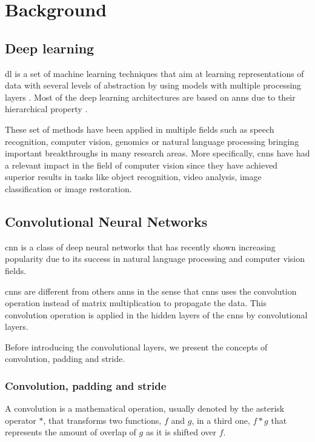 \section{Background}\label{sec:background}

\subsection{Deep learning}
\gls{dl} is a set of machine learning techniques that aim at learning representations of data with several levels of abstraction by using models with multiple processing layers \cite{DL2}. Most of the deep learning architectures are based on \glspl{ann} due to their hierarchical property \cite{DL1} \cite{DBLP:DEEPSISR}.

These set of methods have been applied in multiple fields such as speech recognition, computer vision, genomics or natural language processing bringing important breakthroughs in many research areas. More specifically, \glspl{cnn} have had a relevant impact in the field of computer vision since they have achieved superior results in tasks like object recognition, video analysis, image classification or image restoration.

\subsection{Convolutional Neural Networks}
\gls{cnn} is a class of deep neural networks that has recently shown increasing popularity due to its success in natural language processing and computer vision fields.

\glspl{cnn} are different from others \glspl{ann} in the sense that \glspl{cnn} uses the convolution operation instead of matrix multiplication to propagate the data. This convolution operation is applied in the hidden layers of the \glspl{cnn} by convolutional layers.

Before introducing the convolutional layers, we present the concepts of convolution, padding and stride.

\subsubsection{Convolution, padding and stride}
A convolution is a mathematical operation, usually denoted by the asterisk operator $\ast$, that transforms two functions, $f$ and $g$, in a third one, $f\ast g$ that represents the amount of overlap of $g$ as it is shifted over $f$.

